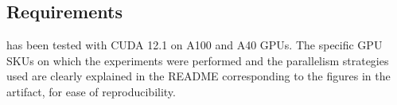 \subsection*{Requirements}

\sysname has been tested with CUDA 12.1 on A100 and A40 GPUs. The specific GPU SKUs on which the experiments were performed and the parallelism strategies used are clearly explained in the README corresponding to the figures in the artifact, for ease of reproducibility.



